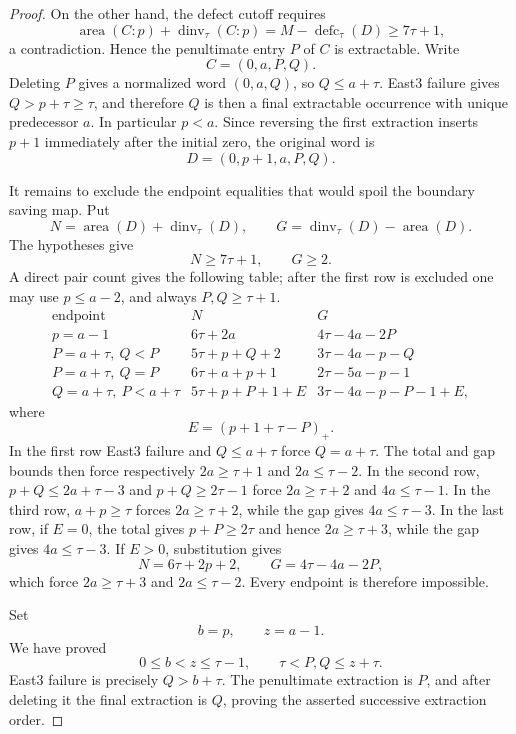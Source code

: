 \documentclass[11pt]{article}
\theoremstyle{definition}
\theoremstyle{remark}
\newcommand{\area}{\operatorname{area}}
\newcommand{\dinv}{\operatorname{dinv}}
\newcommand{\defc}{\operatorname{defc}}
\begin{document}
\begin{proof}
On the other hand, the defect cutoff requires
\[
 \area(C:p)+\dinv_\tau(C:p)
 =M-\defc_\tau(D)\ge7\tau+1,
\]
a contradiction.  Hence the penultimate entry $P$ of $C$ is extractable.
Write
\[
 C=(0,a,P,Q).
\]
Deleting $P$ gives a normalized word $(0,a,Q)$, so $Q\le a+\tau$.
East3 failure gives $Q>p+\tau\ge\tau$, and therefore $Q$ is then a final
extractable occurrence with unique predecessor $a$.  In particular
$p<a$.  Since reversing the first extraction inserts $p+1$ immediately
after the initial zero, the original word is
\begin{equation}
 D=(0,p+1,a,P,Q).
 \label{eq:up-original-boundary}
\end{equation}

It remains to exclude the endpoint equalities that would spoil the boundary
saving map.  Put
\[
 N=\area(D)+\dinv_\tau(D),
 \qquad
 G=\dinv_\tau(D)-\area(D).
\]
The hypotheses give
\[
 N\ge7\tau+1,
 \qquad G\ge2.
\]
A direct pair count gives the following table; after the first row is
excluded one may use $p\le a-2$, and always $P,Q\ge\tau+1$.
\[
\begin{array}{c|c|c}
\text{endpoint}&N&G\\ \hline
p=a-1&6\tau+2a&4\tau-4a-2P\\
P=a+\tau,\ Q<P&5\tau+p+Q+2&3\tau-4a-p-Q\\
P=a+\tau,\ Q=P&6\tau+a+p+1&2\tau-5a-p-1\\
Q=a+\tau,\ P<a+\tau
 &5\tau+p+P+1+E&3\tau-4a-p-P-1+E,
\end{array}
\]
where
\[
 E=(p+1+\tau-P)_+.
\]
In the first row East3 failure and $Q\le a+\tau$ force
$Q=a+\tau$.  The total and gap bounds then force respectively
$2a\ge\tau+1$ and $2a\le\tau-2$.  In the second row,
$p+Q\le2a+\tau-3$ and $p+Q\ge2\tau-1$ force
$2a\ge\tau+2$ and $4a\le\tau-1$.  In the third row,
$a+p\ge\tau$ forces $2a\ge\tau+2$, while the gap gives
$4a\le\tau-3$.  In the last row, if $E=0$, the total gives
$p+P\ge2\tau$ and hence $2a\ge\tau+3$, while the gap gives
$4a\le\tau-3$.  If $E>0$, substitution gives
\[
 N=6\tau+2p+2,
 \qquad
 G=4\tau-4a-2P,
\]
which force $2a\ge\tau+3$ and $2a\le\tau-2$.  Every endpoint is therefore
impossible.

Set
\[
 b=p,
 \qquad z=a-1.
\]
We have proved
\[
 0\le b<z\le\tau-1,
 \qquad
 \tau<P,Q\le z+\tau.
\]
East3 failure is precisely $Q>b+\tau$.  The penultimate extraction is $P$,
and after deleting it the final extraction is $Q$, proving the asserted
successive extraction order.
\end{proof}
\end{document}
